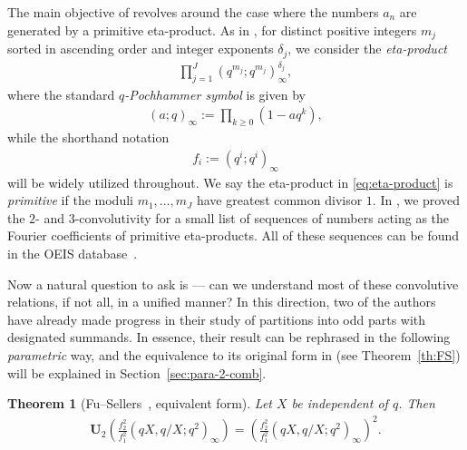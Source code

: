 \documentclass[12pt,reqno]{amsart}
\numberwithin{equation}{section}
\theoremstyle{plain}
\newtheorem{theorem}{Theorem}[section]
\theoremstyle{definition}
\theoremstyle{named}
\newcommand{\UU}{\mathbf{U}}
\begin{document}
The main objective of \cite{CEFS1} revolves around the case where the numbers $a_n$ are generated by a primitive eta-product. As in \cite[eq.~(1.3)]{CEFS1}, for distinct positive integers $m_j$ sorted in ascending order and integer exponents $\delta_j$, we consider the \emph{eta-product}
\begin{align}\label{eq:eta-product}
	\prod_{j=1}^J (q^{m_j};q^{m_j})^{\delta_j}_{\infty},
\end{align}
where the standard \emph{$q$-Pochhammer symbol} is given by
\begin{align*}
	(a;q)_\infty := \prod_{k\ge 0} (1-aq^k),
\end{align*}
while the shorthand notation
\begin{align*}
	f_i := (q^i;q^i)_\infty
\end{align*}
will be widely utilized throughout. We say the eta-product in \eqref{eq:eta-product} is \emph{primitive} if the moduli $m_1,\ldots,m_J$ have greatest common divisor $1$. In \cite{CEFS1}, we proved the $2$- and $3$-convolutivity for a small list of sequences of numbers acting as the Fourier coefficients of primitive eta-products. All of these sequences can be found in the OEIS database~\cite{OEIS}.

Now a natural question to ask is --- can we understand most of these convolutive relations, if not all, in a unified manner? In this direction, two of the authors~\cite{FuSel} have already made progress in their study of partitions into odd parts with designated summands. In essence, their result can be rephrased in the following \emph{parametric} way, and the equivalence to its original form in \cite[p.~3, Theorem~1.3]{FuSel} (see Theorem~\ref{th:FS}) will be explained in Section~\ref{sec:para-2-comb}.

\begin{theorem}[Fu--Sellers~\cite{FuSel}, equivalent form]\label{th:para-2-conv}
	Let $X$ be independent of $q$. Then
	\begin{align}\label{eq:para-2-conv}
		\UU_2\left(\frac{f_2^2}{f_1^2} (qX,q/X;q^2)_\infty\right) = \left(\frac{f_2^2}{f_1^2} (qX,q/X;q^2)_\infty\right)^2.
	\end{align}
\end{theorem}
\end{document}
